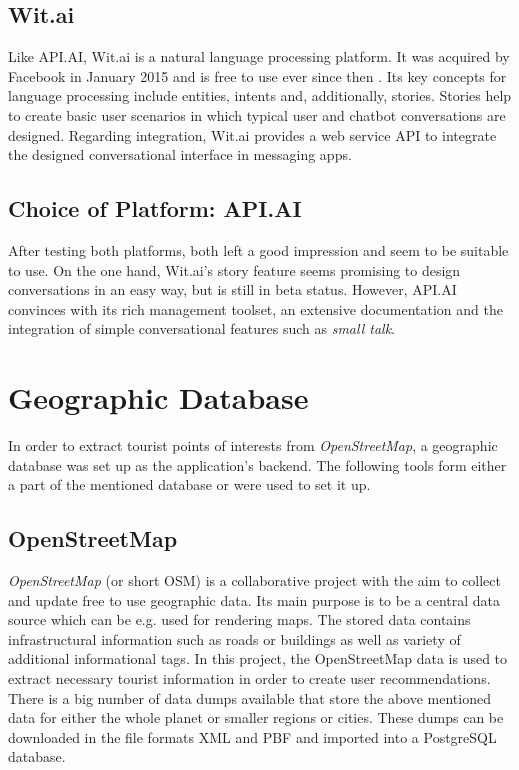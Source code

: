 \subsection{Wit.ai}
Like API.AI, Wit.ai is a natural language processing platform. It was acquired by Facebook in January 2015 and is free to use ever since then \cite{witai:facebook}. Its key concepts for language processing include entities, intents and, additionally, stories. Stories help to create basic user scenarios in which typical user and chatbot conversations are designed. Regarding integration, Wit.ai provides a web service API to integrate the designed conversational interface in messaging apps.

\subsection{Choice of Platform: API.AI}
After testing both platforms, both left a good impression and seem to be suitable to use. On the one hand, Wit.ai’s story feature seems promising to design conversations in an easy way, but is still in beta status. However, API.AI convinces with its rich management toolset, an extensive documentation and the integration of simple conversational features such as \textit{small talk}.

\section{Geographic Database}
In order to extract tourist points of interests from \textit{OpenStreetMap}, a geographic database was set up as the application’s backend. The following tools form either a part of the mentioned database or were used to set it up.

\subsection{OpenStreetMap}
\textit{OpenStreetMap} \cite{osm:about} (or short OSM) is a collaborative project with the aim to collect and update free to use geographic data. Its main purpose is to be a central data source which can be e.g. used for rendering maps. The stored data contains infrastructural information such as roads or buildings as well as variety of additional informational tags. In this project, the OpenStreetMap data is used to extract necessary tourist information in order to create user recommendations. 
There is a big number of data dumps available that store the above mentioned data for either the whole planet or smaller regions or cities. These dumps can be downloaded in the file formats XML and PBF and imported into a PostgreSQL database.

